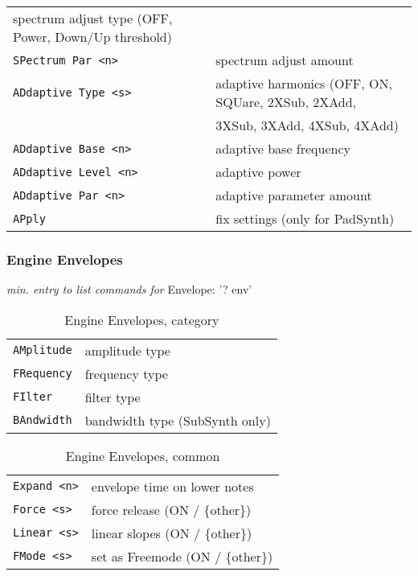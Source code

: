 \begin{table}[H]
\begin{tabular}{l l}
       spectrum adjust type (OFF, Power, Down/Up threshold) \\
   \texttt{SPectrum Par <n>} &
      spectrum adjust amount \\
   \texttt{ADdaptive Type <s>} &
      adaptive harmonics (OFF, ON, SQUare, 2XSub, 2XAdd, \\
   \texttt{} &
       3XSub, 3XAdd, 4XSub, 4XAdd) \\
   \texttt{ADdaptive Base <n>} &
      adaptive base frequency \\
   \texttt{ADdaptive Level <n>} &
      adaptive power \\
   \texttt{ADdaptive Par <n>} &
      adaptive parameter amount \\

   \texttt{APply} &
      fix settings (only for PadSynth) \\
      \end{tabular}
   \end{table}

\subsubsection{Engine Envelopes}
\label{subsec:command_line_engine_envelopes}
   \textsl{min. entry to list commands for} Envelope: '? env'
   \begin{table}[H]
      \centering
      \caption{Engine Envelopes, category}
      \label{table:yoshimi_engine_envelopes_types}
      \begin{tabular}{l l}
\texttt{AMplitude} &
   amplitude type \\
\texttt{FRequency} &
   frequency type \\
\texttt{FIlter} &
   filter type \\
\texttt{BAndwidth} &
   bandwidth type (SubSynth only) \\
      \end{tabular}
   \end{table}

   \begin{table}[H]
      \centering
      \caption{Engine Envelopes, common}
      \label{table:yoshimi_engine_envelopes_controls}
      \begin{tabular}{l l}
\texttt{Expand <n>} &
   envelope time on lower notes \\
\texttt{Force <s>} &
   force release (ON / \{other\}) \\
\texttt{Linear <s>} &
   linear slopes (ON / \{other\}) \\
\texttt{FMode <s>} &
   set as Freemode (ON / \{other\}) \\
      \end{tabular}
   \end{table}


